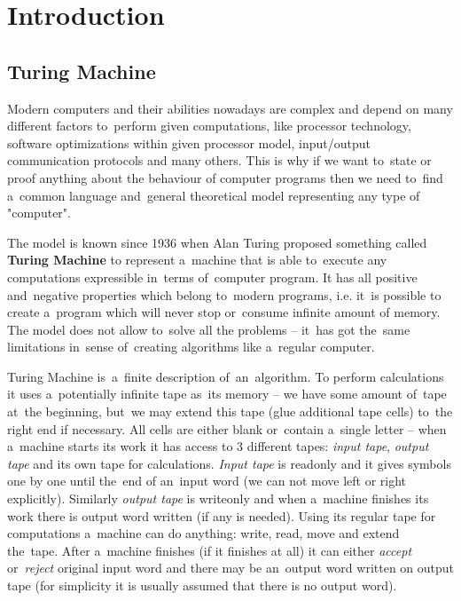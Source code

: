 \documentclass[english,shortabstract,mgr]{iithesis}
\author         {Jadwiga Pokorska}
\begin{document}

\chapter{Introduction}

\section{Turing Machine}

Modern computers and their abilities nowadays are complex and depend on many different factors
to~perform given computations, like processor technology, software optimizations within given
processor model, input/output communication protocols and many others. This is why if we want
to~state or proof anything about the behaviour of computer programs then we need to~find a~common
language and~general theoretical model representing any type of "computer".

The model is known since 1936 \cite{turing1937computable} when Alan Turing proposed something
called \textbf{Turing Machine}
to represent a~machine that is able to~execute any computations expressible in~terms of~computer program.
It has all positive and~negative properties which belong to~modern programs, i.e. it~is possible
to create a~program which will never stop or~consume infinite amount of memory. The model does not allow
to~solve all the problems -- it~has got the~same limitations in~sense of~creating algorithms
like a~regular computer.

Turing Machine is~a~finite description of~an~algorithm. To perform calculations it uses
a~potentially infinite tape as~its memory -- we have some amount of~tape at~the beginning,
but~we may extend this tape (glue additional tape cells) to~the right end if necessary.
All cells are either blank or~contain a~single letter -- when a~machine starts its
work it has access to $3$ different tapes: \textit{input tape}, \textit{output tape} and
its own tape for calculations.
\textit{Input tape} is readonly and it gives symbols one by one until the~end of an~input word
(we can not move left or right explicitly). Similarly \textit{output tape} is writeonly and
when a~machine finishes its work there is output word written (if any is needed). Using its regular
tape for computations a~machine can do anything: write, read, move and extend the~tape.
After a~machine finishes (if it finishes at all) it can either \textit{accept}
or~\textit{reject} original input word and there may be an~output word written on output tape
(for simplicity it is usually assumed that there is no output word).
\end{document}
